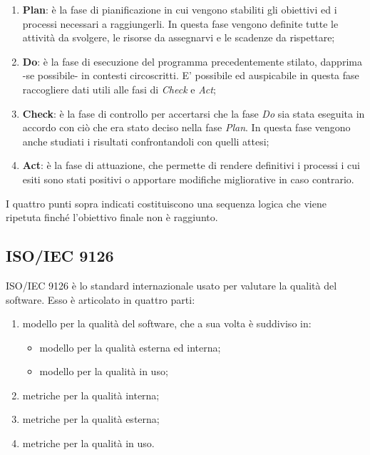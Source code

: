 \begin{enumerate}
	\item{\textbf{Plan}: è la fase di pianificazione in cui vengono stabiliti gli obiettivi ed i processi necessari a raggiungerli. In questa fase vengono definite tutte le attività da svolgere, le risorse da assegnarvi e le scadenze da rispettare;}
	\item{\textbf{Do}: è la fase di esecuzione del programma precedentemente stilato, dapprima -se possibile- in contesti circoscritti. E' possibile ed auspicabile in questa fase raccogliere dati utili alle fasi di \textit{Check} e \textit{Act};}
	\item{\textbf{Check}: è la fase di controllo per accertarsi che la fase \textit{Do} sia stata eseguita in accordo con ciò che era stato deciso nella fase \textit{Plan}. In questa fase vengono anche studiati i risultati confrontandoli con quelli attesi;}
	\item{\textbf{Act}: è la fase di attuazione, che permette di rendere definitivi i processi i cui esiti sono stati positivi o apportare modifiche migliorative in caso contrario.}
\end{enumerate}
I quattro punti sopra indicati costituiscono una sequenza logica che viene ripetuta finché l'obiettivo finale non è raggiunto.
\pagebreak

\subsection{ISO/IEC 9126}
ISO/IEC 9126 è lo standard internazionale usato per valutare la qualità del software. Esso è articolato in quattro parti:
\begin{enumerate}
	\item{modello per la qualità del software, che a sua volta è suddiviso in:}
	\begin{itemize}
		\item{modello per la qualità esterna ed interna;}
		\item{modello per la qualità in uso;}
	\end{itemize}
	\item{metriche per la qualità interna;}
	\item{metriche per la qualità esterna;}
	\item{metriche per la qualità in uso.}
\end{enumerate}

